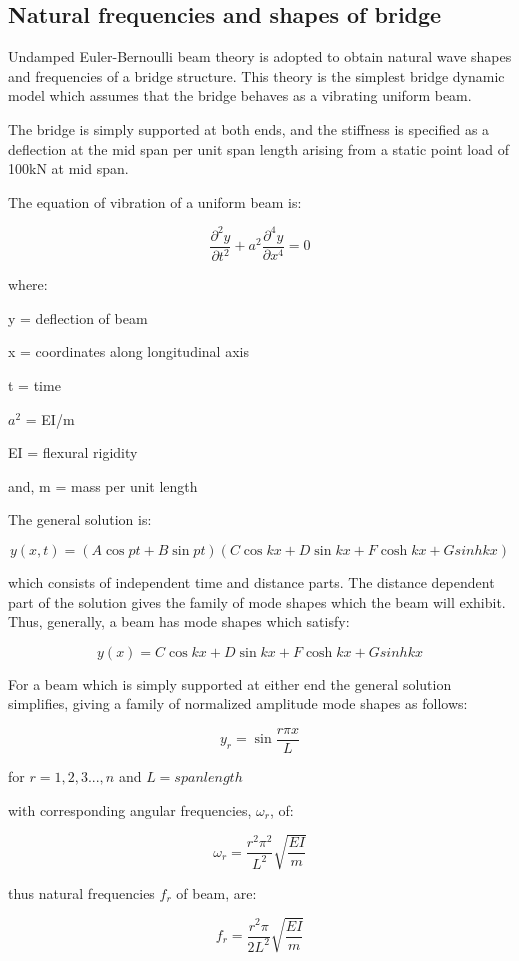 \subsection{Natural frequencies and shapes of bridge}
Undamped Euler-Bernoulli beam theory is adopted to obtain natural wave shapes and frequencies of a bridge structure. This theory is the simplest bridge dynamic model which assumes that the bridge behaves as a vibrating uniform beam. 

The bridge is simply supported at both ends, and the stiffness is specified as a deflection at the mid span per unit span length arising from a static point load of 100kN at mid span.

The equation of vibration of a uniform beam is:

$$\frac{\partial^2 y}{\partial t^2} + a^2\frac{\partial^4 y}{\partial x^4}=0$$

where: 

y = deflection of beam

x = coordinates along longitudinal axis

t = time 

$a^2$ = EI/m

EI = flexural rigidity

and, m = mass per unit length

The general solution is:

$$y(x,t) = (A\cos pt+B\sin pt)(C\cos kx + D\sin kx + F\cosh kx + Gsinh kx)$$

which consists of independent time and distance parts. The distance dependent part of the solution gives the family of mode shapes which the beam will exhibit. Thus, generally, a beam has mode shapes which satisfy:

$$y(x) = C\cos kx + D\sin kx + F\cosh kx + Gsinh kx $$

For a beam which is simply supported at either end the general solution simplifies, giving a family of normalized amplitude mode shapes as follows:

$$y_r = \sin \frac{r\pi x}{L}$$

for $r = 1,2,3...,n$ and $L = span length$

with corresponding angular frequencies, $\omega_r$, of:

$$\omega_r = \frac{r^2 \pi^2}{L^2}\sqrt{\frac{EI}{m}}$$

thus natural frequencies $f_r$ of beam, are:

$$f_r = \frac{r^2 \pi}{2L^2}\sqrt{\frac{EI}{m}}$$

